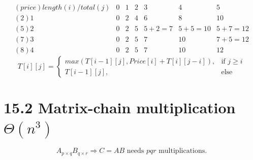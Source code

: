 \documentclass[a4paper]{article}
\begin{document}
    $$
    \begin{array}{c|cccccc}
    (price)length(i)/total(j)& 0 & 1 & 2 & 3 & 4 & 5\\
    \hline
    (2)1 & 0 & 2 & 4 & 6 & 8 & 10 \\
    (5)2 & 0 & 2 & 5 & 5+2=7 & 5+5=10 & 5+7=12 \\
    (7)3 & 0 & 2 & 5 & 7 & 10 & 7+5=12 \\
    (8)4 & 0 & 2 & 5 & 7 & 10 & 12
    \end{array}
    $$
    $$
    T[i][j]=
        \begin{cases}
        max(T[i-1][j], Price[i]+ T[i][j-i]),  & \text{if $j \geq i$} \\
        T[i-1][j], & \text{else}
        \end{cases}
    $$
    
\section*{15.2 Matrix-chain multiplication $\Theta(n^3)$}
$$A_{p\times q} B_{q\times r}\Rightarrow C=AB \text{ needs } pqr \text{ multiplications.}$$
\end{document}
